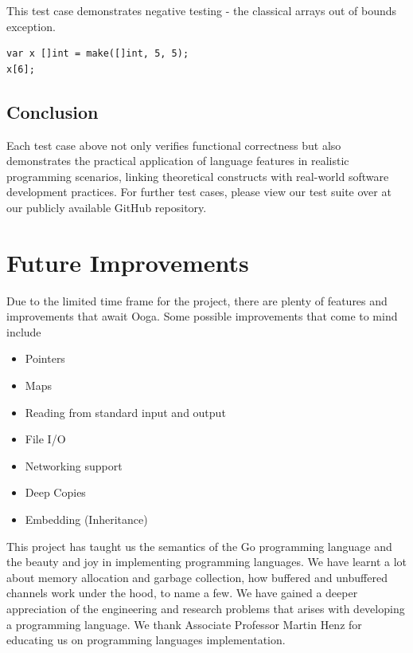 \documentclass{report}
\begin{document}
This test case demonstrates negative testing - the classical arrays out of bounds exception.

\begin{verbatim}
var x []int = make([]int, 5, 5);
x[6];  
\end{verbatim}

\subsection{Conclusion}

Each test case above not only verifies functional correctness but also demonstrates the practical application of language features in realistic programming scenarios, linking theoretical constructs with real-world software development practices. For further test cases, please view our test suite over at our publicly available GitHub repository.

\section{Future Improvements}

Due to the limited time frame for the project, there are plenty of features and improvements that await Ooga. Some possible improvements that come to mind include

\begin{itemize}
    \item Pointers
    \item Maps
    \item Reading from standard input and output
    \item File I/O
    \item Networking support
    \item Deep Copies
    \item Embedding (Inheritance)
\end{itemize}

This project has taught us the semantics of the Go programming language and the beauty and joy in implementing programming languages. We have learnt a lot about memory allocation and garbage collection, how buffered and unbuffered channels work under the hood, to name a few. We have gained a deeper appreciation of the engineering and research problems that arises with developing a programming language. We thank Associate Professor Martin Henz for educating us on programming languages implementation.
\end{document}

